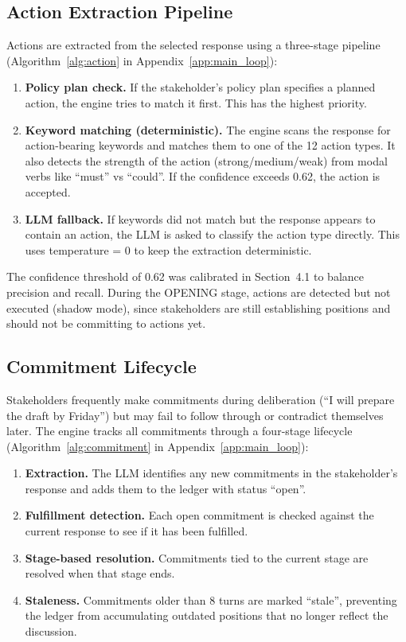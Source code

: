 \documentclass[12pt, a4paper]{report}
\begin{document}
\subsection{Action Extraction Pipeline}

Actions are extracted from the selected response using a three-stage pipeline (Algorithm~\ref{alg:action} in Appendix~\ref{app:main_loop}):

\begin{enumerate}[leftmargin=*, itemsep=2pt]
    \item \textbf{Policy plan check.} If the stakeholder's policy plan specifies a planned action, the engine tries to match it first. This has the highest priority.
    \item \textbf{Keyword matching (deterministic).} The engine scans the response for action-bearing keywords and matches them to one of the 12 action types. It also detects the strength of the action (strong/medium/weak) from modal verbs like ``must'' vs ``could''. If the confidence exceeds 0.62, the action is accepted.
    \item \textbf{LLM fallback.} If keywords did not match but the response appears to contain an action, the LLM is asked to classify the action type directly. This uses temperature = 0 to keep the extraction deterministic.
\end{enumerate}

The confidence threshold of 0.62 was calibrated in Section~4.1 to balance precision and recall. During the OPENING stage, actions are detected but not executed (shadow mode), since stakeholders are still establishing positions and should not be committing to actions yet.

\subsection{Commitment Lifecycle}

Stakeholders frequently make commitments during deliberation (``I will prepare the draft by Friday'') but may fail to follow through or contradict themselves later. The engine tracks all commitments through a four-stage lifecycle (Algorithm~\ref{alg:commitment} in Appendix~\ref{app:main_loop}):

\begin{enumerate}[leftmargin=*, itemsep=2pt]
    \item \textbf{Extraction.} The LLM identifies any new commitments in the stakeholder's response and adds them to the ledger with status ``open''.
    \item \textbf{Fulfillment detection.} Each open commitment is checked against the current response to see if it has been fulfilled.
    \item \textbf{Stage-based resolution.} Commitments tied to the current stage are resolved when that stage ends.
    \item \textbf{Staleness.} Commitments older than 8 turns are marked ``stale'', preventing the ledger from accumulating outdated positions that no longer reflect the discussion.
\end{enumerate}
\end{document}
